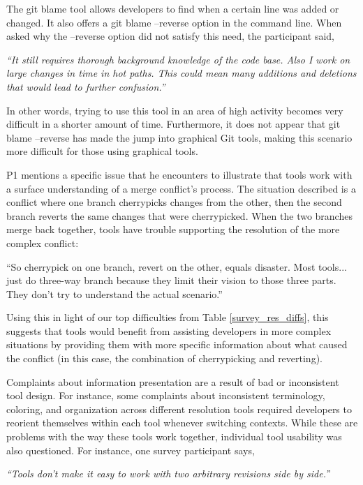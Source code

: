 The git blame tool allows developers to find when a certain line was added or changed. It also offers a git blame --reverse option in the command line. When asked why the --reverse option did not satisfy this need, the participant said, 

\begin{displayquote}
\textit{``It still requires thorough background knowledge of the code base. Also I work on large changes in time in hot paths. This could mean many additions and deletions that would lead to further confusion.''}
\end{displayquote}

 In other words, trying to use this tool in an area of high activity becomes very difficult in a shorter amount of time. Furthermore, it does not appear that git blame --reverse has made the jump into graphical Git tools, making this scenario more difficult for those using graphical tools.
 
 P1 mentions a specific issue that he encounters to illustrate that tools work with a surface understanding of a merge conflict's process. The situation described is a conflict where one branch cherrypicks changes from the other, then the second branch reverts the same changes that were cherrypicked. When the two branches merge back together, tools have trouble supporting the resolution of the more complex conflict:
 \begin{displayquote}
 ``So cherrypick on one branch, revert on the other, equals disaster. Most tools... just do three-way branch because they limit their vision to those three parts. They don't try to understand the actual scenario.''
 \end{displayquote}
 Using this in light of our top difficulties from Table \ref{survey_res_diffs}, this suggests that tools would benefit from assisting developers in more complex situations by providing them with more specific information about what caused the conflict (in this case, the combination of cherrypicking and reverting). 


Complaints about information presentation are a result of bad or inconsistent tool design. For instance, some complaints about inconsistent terminology, coloring, and organization across different resolution tools required developers to reorient themselves within each tool whenever switching contexts. While these are problems with the way these tools work together, individual tool usability was also questioned. For instance, one survey participant says, 
\begin{displayquote}
\textit{``Tools don't make it easy to work with two arbitrary revisions side by side.''}
\end{displayquote}

